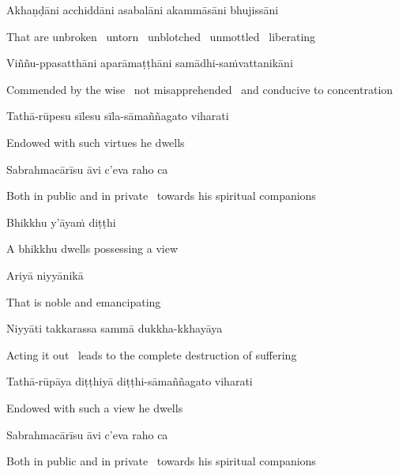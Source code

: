 Akhaṇḍāni acchiddāni asabalāni akammāsāni bhujissāni

\begin{english}
  That are unbroken \breathmark\ untorn \breathmark\ unblotched \breathmark\ unmottled \breathmark\ liberating
\end{english}

Viññu-ppasatthāni aparāmaṭṭhāni samādhi-saṁvattanikāni

\begin{english-hang}
  Commended by the wise \breathmark\ not misapprehended \breathmark\ and conducive to concentration
\end{english-hang}

Tathā-rūpesu sīlesu sīla-sāmaññagato viharati

\begin{english}
  Endowed with such virtues he dwells
\end{english}

\ifninebythirteenversion\clearpage\fi

Sabrahmacārīsu āvi c'eva raho ca

\begin{english}
  Both in public and in private \breathmark\ towards his spiritual companions
\end{english}

Bhikkhu y'āyaṁ diṭṭhi

\begin{english}
  A bhikkhu dwells possessing a view
\end{english}

Ariyā niyyānikā

\begin{english}
  That is noble and emancipating
\end{english}

Niyyāti takkarassa sammā dukkha-kkhayāya

\begin{english}
  Acting it out \breathmark\ leads to the complete destruction of suffering
\end{english}

Tathā-rūpāya diṭṭhiyā diṭṭhi-sāmaññagato viharati

\begin{english}
  Endowed with such a view he dwells
\end{english}

Sabrahmacārīsu āvi c'eva raho ca

\begin{english}
  Both in public and in private \breathmark\ towards his spiritual companions
\end{english}

